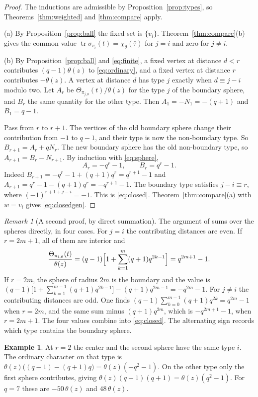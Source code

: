\documentclass[12pt,letterpaper]{article}
\numberwithin{equation}{section}
\theoremstyle{definition}
\newtheorem{example}[theorem]{Example}
\theoremstyle{remark}
\newtheorem{remark}[theorem]{Remark}
\newcommand{\tr}{\operatorname{tr}}
\begin{document}
\begin{proof}
The inductions are admissible by Proposition~\ref{prop:types}, so Theorems~\ref{thm:weighted} and \ref{thm:compare} apply.

(a) By Proposition~\ref{prop:ball} the fixed set is $\{v_i\}$. Theorem~\ref{thm:compare}(b) gives the common value $\tr\sigma_{v_i}(t)=\chi_\theta(\bar\tau)$ for $j=i$ and zero for $j\ne i$.

(b) By Proposition~\ref{prop:ball} and \eqref{eq:finite}, a fixed vertex at distance $d<r$ contributes $(q-1)\theta(z)$ to \eqref{eq:ordinary}, and a fixed vertex at distance $r$ contributes $-\theta(z)$. A vertex at distance $d$ has type $j$ exactly when $d\equiv j-i$ modulo two. Let $A_r$ be $\Theta_{\pi_{j,\theta}}(t)/\theta(z)$ for the type $j$ of the boundary sphere, and $B_r$ the same quantity for the other type. Then $A_1=-N_1=-(q+1)$ and $B_1=q-1$.

Pass from $r$ to $r+1$. The vertices of the old boundary sphere change their contribution from $-1$ to $q-1$, and their type is now the non-boundary type. So $B_{r+1}=A_r+qN_r$. The new boundary sphere has the old non-boundary type, so $A_{r+1}=B_r-N_{r+1}$. By induction with \eqref{eq:sphere},
\[
 A_r=-q^r-1,\qquad B_r=q^r-1 .
\]
Indeed $B_{r+1}=-q^r-1+(q+1)q^r=q^{r+1}-1$ and $A_{r+1}=q^r-1-(q+1)q^r=-q^{r+1}-1$. The boundary type satisfies $j-i\equiv r$, where $(-1)^{r+1+j-i}=-1$. This is \eqref{eq:closed}. Theorem~\ref{thm:compare}(a) with $w=v_i$ gives \eqref{eq:closedgen}.
\end{proof}

\begin{remark}[A second proof, by direct summation]\label{rem:directsum}
The argument of \cite{Jo26a} sums over the spheres directly, in four cases. For $j=i$ the contributing distances are even. If $r=2m+1$, all of them are interior and
\[
 \frac{\Theta_{\pi_{i,\theta}}(t)}{\theta(z)}=(q-1)\Bigl[1+\sum_{k=1}^m(q+1)q^{2k-1}\Bigr]=q^{2m+1}-1 .
\]
If $r=2m$, the sphere of radius $2m$ is the boundary and the value is $(q-1)\bigl[1+\sum_{k=1}^{m-1}(q+1)q^{2k-1}\bigr]-(q+1)q^{2m-1}=-q^{2m}-1$. For $j\ne i$ the contributing distances are odd. One finds $(q-1)\sum_{k=0}^{m-1}(q+1)q^{2k}=q^{2m}-1$ when $r=2m$, and the same sum minus $(q+1)q^{2m}$, which is $-q^{2m+1}-1$, when $r=2m+1$. The four values combine into \eqref{eq:closed}. The alternating sign records which type contains the boundary sphere.
\end{remark}

\begin{example}
At $r=2$ the center and the second sphere have the same type $i$. The ordinary character on that type is $\theta(z)\bigl((q-1)-(q+1)q\bigr)=\theta(z)(-q^2-1)$. On the other type only the first sphere contributes, giving $\theta(z)(q-1)(q+1)=\theta(z)(q^2-1)$. For $q=7$ these are $-50\,\theta(z)$ and $48\,\theta(z)$.
\end{example}
\end{document}
